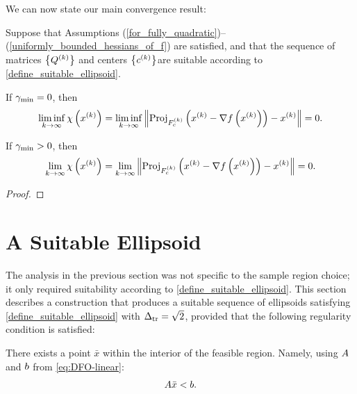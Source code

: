 \documentclass{article}
\let\oldref\ref
\renewcommand{\ref}[1]{(\oldref{#1})}
\begin{document}
We can now state our main convergence result:

\begin{theorem}\label{main_result}
Suppose that Assumptions \ref{for_fully_quadratic}--\ref{uniformly_bounded_hessians_of_f} are satisfied,
and that the sequence of matrices $\left\{{Q^{(k)}}\right\}$ and centers $\left\{c^{(k)}\right\}$are suitable according to \cref{define_suitable_ellipsoid}.


If $\gamma_{\textrm{min}} = 0$, then
\begin{align*}
\liminf_{k\to\infty} \chi\left(x^{(k)}\right) = \liminf_{k\to\infty} \left\|{\textrm{Proj}}_{{F_c^{(k)}}}\left(x^{(k)} - \nabla f\left(x^{(k)}\right)\right) - x^{(k)} \right\| = 0.
\end{align*}

If $\gamma_{\textrm{min}} > 0$, then
\begin{align*}
\lim_{k\to\infty} \chi\left(x^{(k)}\right) = \lim_{k\to\infty} \left\|{\textrm{Proj}}_{{F_c^{(k)}}}\left(x^{(k)} - \nabla f\left(x^{(k)}\right)\right) - x^{(k)} \right\| = 0.
\end{align*}
\end{theorem}

\begin{proof}

\end{proof}


\section{A Suitable Ellipsoid}
\label{sec:ellipsoidal}


\label{the_safe_ellipsoid}

The analysis in the previous section was not specific to the sample region choice; it only required suitability according to \cref{define_suitable_ellipsoid}.
This section describes a construction that produces a suitable sequence of ellipsoids satisfying \cref{define_suitable_ellipsoid} with $\Delta_{\textrm{tr}}=\sqrt{2}$, provided that the following regularity condition is satisfied:
\begin{assumption}
\label{interior_point}
There exists a point $\bar x$ within the interior of the feasible region.
Namely, using ${A}$ and ${b}$ from \cref{eq:DFO-linear}:
\begin{align}
{A} \bar x < {b}.
\end{align}
\end{assumption}
\end{document}
